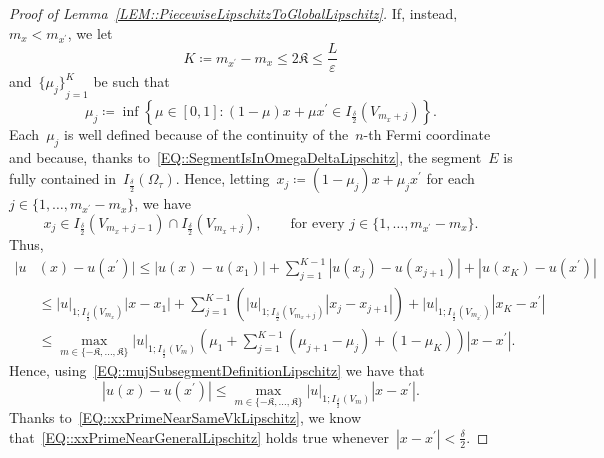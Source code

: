 \documentclass[10pt,a4paper]{amsart}
\newcommand{\abs}[1]{\left\lvert#1\right\rvert}
\newcommand{\eps}{\varepsilon}
\renewcommand{\leq}{\leqslant}
\begin{document}
\begin{proof}[Proof of Lemma~\ref{LEM::PiecewiseLipschitzToGlobalLipschitz}]
    If, instead,~$m_x < m_{x^\prime}$, we let
    \begin{equation}\label{OLD::EQ::KdefinitionAndBound}
        K \coloneq m_{x^\prime} - m_x \leq 2\mathfrak{K} \leq \frac{L}{\eps}
    \end{equation}
    and~${\{\mu_j\}}_{j=1}^K$ be such that
    \begin{equation}\label{EQ::mujSubsegmentDefinitionLipschitz}
        \mu_j \coloneq \inf\left\{\mu \in [0,1] \colon (1-\mu)x + \mu x^\prime \in I_{\frac{\delta}{2}}(V_{m_x + j})\right\}.
    \end{equation}
    Each~$\mu_j$ is well defined because of the continuity of the~$n$-th Fermi coordinate and because, thanks to~\eqref{EQ::SegmentIsInOmegaDeltaLipschitz}, the segment~$E$ is fully contained in~$I_{\frac{\delta}{2}}(\Omega_\tau)$. Hence, letting~$x_j \coloneq (1-\mu_j)x + \mu_j x^\prime$ for each~$j \in \{1,\dots,m_{x^\prime}-m_x\}$, we have
    \begin{equation}
        x_j \in I_{\frac{\delta}{2}}(V_{m_x + j - 1})\cap I_{\frac{\delta}{2}}(V_{m_x + j}),\qquad \text{for every }j \in \{1,\dots,m_{x^\prime}-m_x\}.
    \end{equation}
    Thus,
    \begin{equation}
        \begin{split}
            |u&(x)-u(x^\prime)| \leq \abs{u(x)-u(x_1)} + \sum_{j=1}^{K-1} \abs{u(x_j)-u(x_{j+1})} + \abs{u(x_K)-u(x^\prime)}\\
                &\leq \abs{u}_{1; I_{\frac{\delta}{2}}(V_{m_x})} \abs{x-x_1} + \sum_{j=1}^{K-1} \left( \abs{u}_{1; I_{\frac{\delta}{2}}(V_{m_x + j})} \abs{x_j-x_{j+1}}\right)+\abs{u}_{1; I_{\frac{\delta}{2}}(V_{m_{x^\prime}})} \abs{x_K - x^\prime}\\
                &\leq \max_{m \in \{-\mathfrak{K},\dots,\mathfrak{K}\}} \abs{u}_{1; I_{\frac{\delta}{2}}(V_m)} \left( \mu_1 + \sum_{j=1}^{K-1} {(\mu_{j+1}-\mu_j)} + {(1-\mu_K)}\right)\abs{x-x^\prime}.
        \end{split}
    \end{equation}
    Hence, using~\eqref{EQ::mujSubsegmentDefinitionLipschitz} we have that
    \begin{equation}\label{EQ::xxPrimeNearGeneralLipschitz}
            |u(x)-u(x^\prime)| \leq \max_{m \in \{-\mathfrak{K},\dots,\mathfrak{K}\}} \abs{u}_{1; I_{\frac{\delta}{2}}(V_m)}\abs{x-x^\prime}.
    \end{equation}
    Thanks to~\eqref{EQ::xxPrimeNearSameVkLipschitz}, we know that~\eqref{EQ::xxPrimeNearGeneralLipschitz} holds true whenever~$\abs{x-x^\prime} < \frac{\delta}{2}$.


\end{proof}
\end{document}
